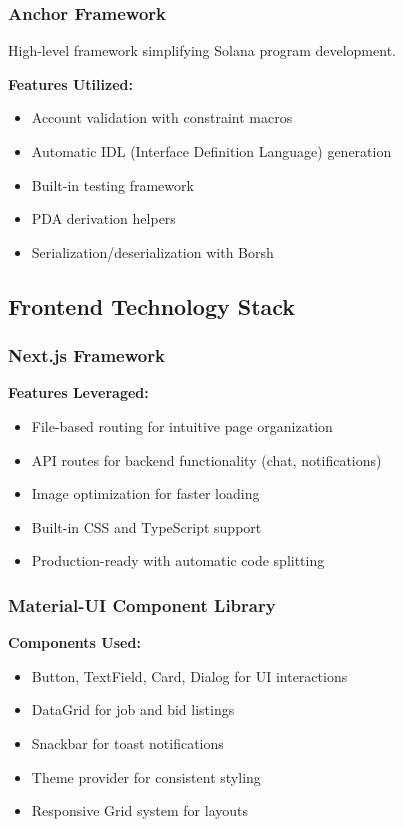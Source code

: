 \documentclass[a4paper,13pt,twoside]{report}
\theoremstyle{definition}
\begin{document}
\subsubsection{Anchor Framework}

High-level framework simplifying Solana program development.

\textbf{Features Utilized:}
\begin{itemize}
    \item Account validation with constraint macros
    \item Automatic IDL (Interface Definition Language) generation
    \item Built-in testing framework
    \item PDA derivation helpers
    \item Serialization/deserialization with Borsh
\end{itemize}

\subsection{Frontend Technology Stack}

\subsubsection{Next.js Framework}

\textbf{Features Leveraged:}
\begin{itemize}
    \item File-based routing for intuitive page organization
    \item API routes for backend functionality (chat, notifications)
    \item Image optimization for faster loading
    \item Built-in CSS and TypeScript support
    \item Production-ready with automatic code splitting
\end{itemize}

\subsubsection{Material-UI Component Library}

\textbf{Components Used:}
\begin{itemize}
    \item Button, TextField, Card, Dialog for UI interactions
    \item DataGrid for job and bid listings
    \item Snackbar for toast notifications
    \item Theme provider for consistent styling
    \item Responsive Grid system for layouts
\end{itemize}
\end{document}
